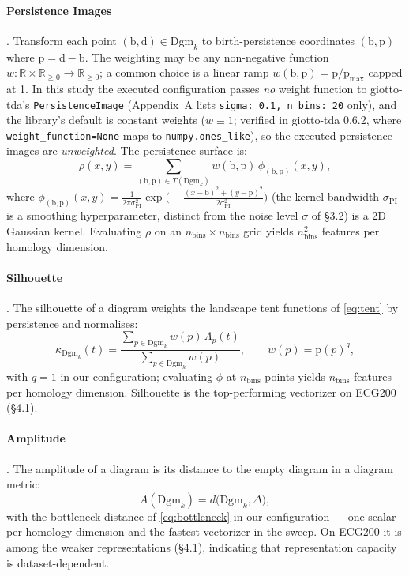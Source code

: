 \documentclass[12pt, a4paper]{report}
\newcommand{\Dgm}{\mathrm{Dgm}}
\newcommand{\birth}{\mathrm{b}}
\newcommand{\death}{\mathrm{d}}
\newcommand{\pers}{\mathrm{p}}
\newcommand{\R}{\mathbb{R}}
\theoremstyle{definition}
\theoremstyle{plain}
\theoremstyle{remark}
\begin{document}
\paragraph{Persistence Images} \cite{adams2017}.
Transform each point $(\birth, \death) \in \Dgm_k$ to birth-persistence
coordinates $(\birth, \pers)$ where $\pers = \death - \birth$. The weighting may be any
non-negative function $w: \R \times \R_{\ge 0} \to \R_{\ge 0}$;
a common choice is a linear ramp
$w(\birth, \pers) = \pers / \pers_{\max}$ capped at 1. In this
study the executed configuration passes \emph{no} weight function to
giotto-tda's \texttt{PersistenceImage} (Appendix~A lists
\texttt{sigma: 0.1, n\_bins: 20} only), and the library's default is
constant weights ($w \equiv 1$; verified in giotto-tda 0.6.2,
where \texttt{weight\_function=None} maps to
\texttt{numpy.ones\_like}), so the executed persistence images are
\emph{unweighted}. The persistence surface is:
\begin{equation}
  \rho(x, y) = \sum_{(\birth, \pers) \in T(\Dgm_k)} w(\birth, \pers)
  \, \phi_{(\birth,\pers)}(x, y),
  \label{eq:pi_surface}
\end{equation}
where $\phi_{(\birth,\pers)}(x, y) = \frac{1}{2\pi\sigma_{\mathrm{PI}}^2}
\exp\!\bigl(-\frac{(x-\birth)^2 + (y-\pers)^2}{2\sigma_{\mathrm{PI}}^2}\bigr)$
(the kernel bandwidth $\sigma_{\mathrm{PI}}$ is a smoothing
hyperparameter, distinct from the noise level $\sigma$ of
\S3.2)
is a 2D Gaussian kernel. Evaluating $\rho$ on an $n_{\text{bins}}
\times n_{\text{bins}}$ grid yields $n_{\text{bins}}^2$ features per
homology dimension.

\paragraph{Silhouette} \cite{chazalSilh2014}.
The silhouette of a diagram weights the landscape tent functions of
\eqref{eq:tent} by persistence and normalises:
\begin{equation}
  \kappa_{\Dgm_k}(t) = \frac{\sum_{p \in \Dgm_k}
  w(p)\,\Lambda_p(t)}{\sum_{p \in \Dgm_k} w(p)},
  \qquad w(p) = \pers(p)^q,
  \label{eq:silhouette}
\end{equation}
with $q = 1$ in our configuration; evaluating $\phi$ at
$n_{\text{bins}}$ points yields $n_{\text{bins}}$ features per
homology dimension. Silhouette is the top-performing vectorizer on
ECG200 (\S4.1).

\paragraph{Amplitude}.
The amplitude of a diagram is its distance to the empty diagram in a
diagram metric:
\begin{equation}
  A(\Dgm_k) = d\bigl(\Dgm_k, \Delta\bigr),
  \label{eq:amplitude}
\end{equation}
with the bottleneck distance of \eqref{eq:bottleneck} in our
configuration --- one scalar per homology dimension and the fastest
vectorizer in the sweep. On ECG200 it is among the weaker
representations (\S4.1), indicating that representation capacity
is dataset-dependent.
\end{document}
